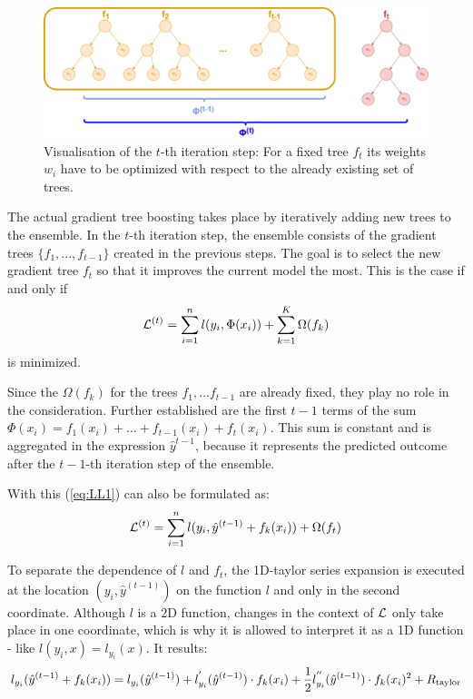 \begin{figure}[H]
	\begin{center}
		\includegraphics[width=\textwidth]{images/gradient_boosting.png}
		\caption{Visualisation of the $t$-th iteration step: For a fixed tree $f_t$ its weights $w_i$ have to be optimized with respect to the already existing set of trees.}
		\label{abb:gradient_boosting}
	\end{center}		
\end{figure}
The actual gradient tree boosting takes place by iteratively adding new trees to the ensemble. In the $t$-th iteration step, the ensemble consists of the gradient trees $\{f_1, ... , f_{t-1}\}$ created in the previous steps. The goal is to select the new gradient tree $f_t$ so that it improves the current model the most. This is the case if and only if 
\begin{equation}
\mathcal{L}^{(t)} = \sum_{i=1}^{n} l(y_i, \Phi(x_i)) + \sum_{k=1}^{K}\Omega(f_k)
\label{eq:LL1}
\end{equation}
is minimized.

Since the $\Omega(f_k)$ for the trees $f_1, ... f_{t-1}$ are already fixed, they play no role in the consideration. Further established are the first $t-1$ terms of the sum $\Phi(x_i) = f_1(x_i) + ... + f_{t-1}(x_i) + f_t(x_i)$. This sum is constant and is aggregated in the expression $\hat{y}^{t-1}$, because it represents the predicted outcome after the $t-1$-th iteration step of the ensemble.

With this (\ref{eq:LL1}) can also be formulated as:
\begin{equation}
\mathcal{L}^{(t)} = \sum_{i=1}^{n} l(y_i, \hat{y}^{(t-1)} + f_k(x_i)) + \Omega(f_t)
\label{eq:LL2}
\end{equation}

To separate the dependence of $l$ and $f_t$, the 1D-taylor series expansion is executed at the location $(y_i,\hat{y}^{(t-1)})$ on the function $l$ and only in the second coordinate. Although $l$ is a 2D function, changes in the context of $\mathcal{L}$ only take place in one coordinate, which is why it is allowed to interpret it as a 1D function - like $l(y_i,x) = l_{y_i}(x)$. It results:
\begin{equation}
\label{eq:taylor}
l_{y_i}(\hat{y}^{(t-1)} + f_k(x_i)) = l_{y_i}(\hat{y}^{(t-1)}) + l_{y_i}^{'}(\hat{y}^{(t-1)}) \cdot f_k(x_i)
+ \newline \frac{1}{2} l_{y_i}^{''}(\hat{y}^{(t-1)}) \cdot f_k(x_i)^2 + R_\text{taylor}
\end{equation}


